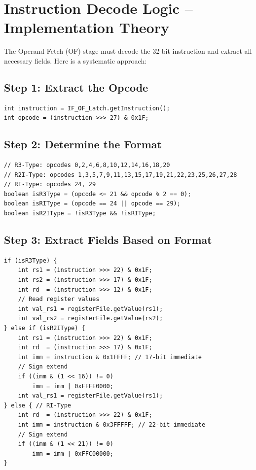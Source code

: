 \documentclass[12pt,a4paper]{article}
\begin{document}
\section{Instruction Decode Logic -- Implementation Theory}

The Operand Fetch (OF) stage must decode the 32-bit instruction and extract all necessary fields. Here is a systematic approach:

\subsection{Step 1: Extract the Opcode}

\begin{lstlisting}[style=javastyle]
int instruction = IF_OF_Latch.getInstruction();
int opcode = (instruction >>> 27) & 0x1F;
\end{lstlisting}

\subsection{Step 2: Determine the Format}

\begin{lstlisting}[style=javastyle]
// R3-Type: opcodes 0,2,4,6,8,10,12,14,16,18,20
// R2I-Type: opcodes 1,3,5,7,9,11,13,15,17,19,21,22,23,25,26,27,28
// RI-Type: opcodes 24, 29
boolean isR3Type = (opcode <= 21 && opcode % 2 == 0);
boolean isRIType = (opcode == 24 || opcode == 29);
boolean isR2IType = !isR3Type && !isRIType;
\end{lstlisting}

\subsection{Step 3: Extract Fields Based on Format}

\begin{lstlisting}[style=javastyle]
if (isR3Type) {
    int rs1 = (instruction >>> 22) & 0x1F;
    int rs2 = (instruction >>> 17) & 0x1F;
    int rd  = (instruction >>> 12) & 0x1F;
    // Read register values
    int val_rs1 = registerFile.getValue(rs1);
    int val_rs2 = registerFile.getValue(rs2);
} else if (isR2IType) {
    int rs1 = (instruction >>> 22) & 0x1F;
    int rd  = (instruction >>> 17) & 0x1F;
    int imm = instruction & 0x1FFFF; // 17-bit immediate
    // Sign extend
    if ((imm & (1 << 16)) != 0)
        imm = imm | 0xFFFE0000;
    int val_rs1 = registerFile.getValue(rs1);
} else { // RI-Type
    int rd  = (instruction >>> 22) & 0x1F;
    int imm = instruction & 0x3FFFFF; // 22-bit immediate
    // Sign extend
    if ((imm & (1 << 21)) != 0)
        imm = imm | 0xFFC00000;
}
\end{lstlisting}
\end{document}
